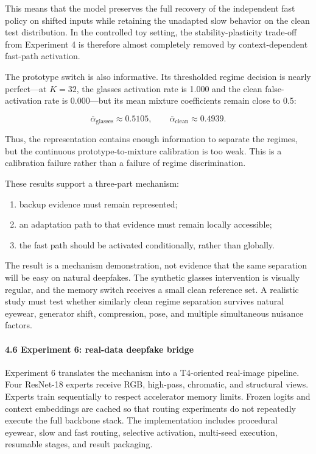 \documentclass[
  10pt,
]{article}
\providecommand{\tightlist}{%
  \setlength{\itemsep}{0pt}\setlength{\parskip}{0pt}}
\begin{document}
This means that the model preserves the full recovery of the independent
fast policy on shifted inputs while retaining the unadapted slow
behavior on the clean test distribution. In the controlled toy setting,
the stability-plasticity trade-off from Experiment 4 is therefore almost
completely removed by context-dependent fast-path activation.

The prototype switch is also informative. Its thresholded regime
decision is nearly perfect---at \(K=32\), the glasses activation rate is
1.000 and the clean false-activation rate is 0.000---but its mean
mixture coefficients remain close to 0.5:

\[
\bar{\alpha}_{\mathrm{glasses}}\approx0.5105,
\qquad
\bar{\alpha}_{\mathrm{clean}}\approx0.4939.
\]

Thus, the representation contains enough information to separate the
regimes, but the continuous prototype-to-mixture calibration is too
weak. This is a calibration failure rather than a failure of regime
discrimination.

These results support a three-part mechanism:

\begin{enumerate}
\def\labelenumi{\arabic{enumi}.}
\tightlist
\item
  backup evidence must remain represented;
\item
  an adaptation path to that evidence must remain locally accessible;
\item
  the fast path should be activated conditionally, rather than globally.
\end{enumerate}

The result is a mechanism demonstration, not evidence that the same
separation will be easy on natural deepfakes. The synthetic glasses
intervention is visually regular, and the memory switch receives a small
clean reference set. A realistic study must test whether similarly clean
regime separation survives natural eyewear, generator shift,
compression, pose, and multiple simultaneous nuisance factors.

\hypertarget{experiment-6-real-data-deepfake-bridge}{%
\paragraph{4.6 Experiment 6: real-data deepfake
bridge}\label{experiment-6-real-data-deepfake-bridge}}

Experiment 6 translates the mechanism into a T4-oriented real-image
pipeline. Four ResNet-18 experts receive RGB, high-pass, chromatic, and
structural views. Experts train sequentially to respect accelerator
memory limits. Frozen logits and context embeddings are cached so that
routing experiments do not repeatedly execute the full backbone stack.
The implementation includes procedural eyewear, slow and fast routing,
selective activation, multi-seed execution, resumable stages, and result
packaging.
\end{document}
